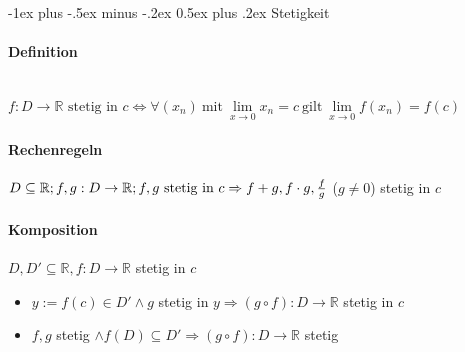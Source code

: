 \documentclass[paper=a3,paper=landscape, fontsize=9pt, DIV=30]{scrartcl}
\makeatletter
\newcommand{\real}{{\mathbb{R}}}
\renewcommand{\section}{\@startsection{section}{1}{0mm}%
  {-1ex plus -.5ex minus -.2ex}%
  {0.5ex plus .2ex}%
  {\color{blue}\normalfont\large\bfseries}}
\makeatother
\begin{document}
\begin{multicols*}{4}

  \section{Stetigkeit}

  \paragraph{Definition}\hspace{0pt} \\
  $f : D \rightarrow \real \text{ stetig in } c \Leftrightarrow \forall (x_n) \ \text{mit}\ \lim\limits_{x \rightarrow 0}x_n = c \ \text{gilt}\ \lim\limits_{x \rightarrow 0}f(x_n)=f(c)$

  \paragraph{Rechenregeln}
  $D \subseteq \real;f,g: D \rightarrow \real;f,g ~\text{stetig in}\ c \\ \Rightarrow f+g, f \cdot g,\frac{f}{g}$ ($g \neq 0$) stetig in $c$

  \paragraph{Komposition}
  $D,D' \subseteq \real, f:D \rightarrow \real$ stetig in $c$
  \begin{itemize}
  \item $y := f(c) \in D' \wedge g $ stetig in $y \Rightarrow (g \circ f): D \rightarrow \real$ stetig in $c$
  \item $f,g$ stetig $\wedge f(D) \subseteq D' \Rightarrow (g \circ f): D \rightarrow \real$ stetig
  \end{itemize}



\end{multicols*}
\end{document}
